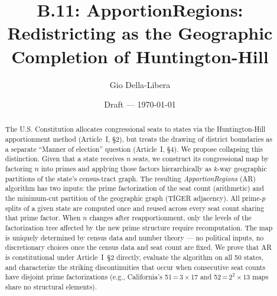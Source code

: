 \documentclass[12pt]{article}
\title{B.11: ApportionRegions:\\
       Redistricting as the Geographic Completion of Huntington-Hill}
\author{Gio Della-Libera}
\date{Draft --- \today}
\begin{document}
\maketitle

\begin{abstract}
The U.S. Constitution allocates congressional seats to states via the
Huntington-Hill apportionment method (Article~I, \S2), but treats the drawing
of district boundaries as a separate ``Manner of election'' question (Article~I,
\S4). We propose collapsing this distinction. Given that a state receives $n$
seats, we construct its congressional map by factoring $n$ into primes and
applying those factors hierarchically as $k$-way geographic partitions of the
state's census-tract graph. The resulting \emph{ApportionRegions}
(AR) algorithm has two inputs: the prime factorization of the seat count
(arithmetic) and the minimum-cut partition of the geographic graph (TIGER
adjacency). All prime-$p$ splits of a given state are computed once and reused
across every seat count sharing that prime factor. When $n$ changes after
reapportionment, only the levels of the factorization tree affected by the new
prime structure require recomputation. The map is uniquely determined by
census data and number theory --- no political inputs, no discretionary choices
once the census data and seat count are fixed. We prove that AR is constitutional under Article~I~\S2 directly,
evaluate the algorithm on all 50 states, and characterize the striking
discontinuities that occur when consecutive seat counts have disjoint prime
factorizations (e.g., California's 51\,=\,3\,$\times$\,17 and
52\,=\,$2^2\times 13$ maps share no structural elements).
\end{abstract}










\end{document}
